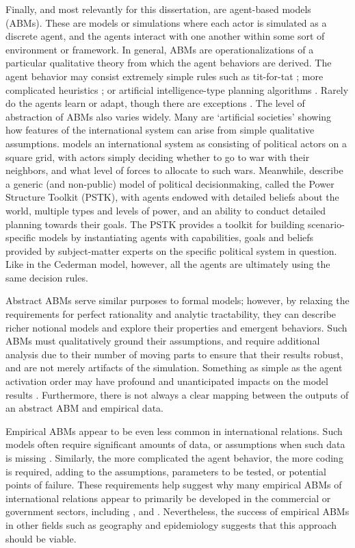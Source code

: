 Finally, and most relevantly for this dissertation, are agent-based models (ABMs). These are models or simulations where each actor is simulated as a discrete agent, and the agents interact with one another within some sort of environment or framework. In general, ABMs are operationalizations of a particular qualitative theory from which the agent behaviors are derived. The agent behavior may consist extremely simple rules such as tit-for-tat \citep{hudson_2004,axelrod_1980}; more complicated heuristics \citep{cederman_1997}; or artificial intelligence-type planning algorithms \citep{taylor_2008}. Rarely do the agents learn or adapt, though there are exceptions \citep{hoffmann_2005,rouleau_2011}. The level of abstraction of ABMs also varies widely. Many are `artificial societies' \citep{epstein_1996} showing how features of the international system can arise from simple qualitative assumptions. \citet{cederman_1997} models an international system as consisting of political actors on a square grid, with actors simply deciding whether to go to war with their neighbors, and what level of forces to allocate to such wars. Meanwhile, \citet{taylor_2008} describe a generic (and non-public) model of political decisionmaking, called the Power Structure Toolkit (PSTK), with agents endowed with detailed beliefs about the world, multiple types and levels of power, and an ability to conduct detailed planning towards their goals. The PSTK provides a toolkit for building scenario-specific models by instantiating agents with capabilities, goals and beliefs provided by subject-matter experts on the specific political system in question. Like in the Cederman model, however, all the agents are ultimately using the same decision rules.

Abstract ABMs serve similar purposes to formal models; however, by relaxing the requirements for perfect rationality and analytic tractability, they can describe richer notional models and explore their properties and emergent behaviors. Such ABMs must qualitatively ground their assumptions, and require additional analysis due to their number of moving parts to ensure that their results robust, and are not merely artifacts of the simulation. Something as simple as the agent activation order may have profound and unanticipated impacts on the model results \citep{comer_2014}. Furthermore, there is not always a clear mapping between the outputs of an abstract ABM and empirical data.

Empirical ABMs appear to be even less common in international relations. Such models often require significant amounts of data, or assumptions when such data is missing \citep{masad_2014B}. Similarly, the more complicated the agent behavior, the more coding is required, adding to the assumptions, parameters to be tested, or potential points of failure. These requirements help suggest why many empirical ABMs of international relations appear to primarily be developed in the commercial or government sectors, including \citet{taylor_2008}, \citet{abdollahian_2006} and \citet{chaturvedi_2000}. Nevertheless, the success of empirical ABMs in other fields such as geography \citep{jantz_2004} and epidemiology \citep{mniszewski_2008} suggests that this approach should be viable.

